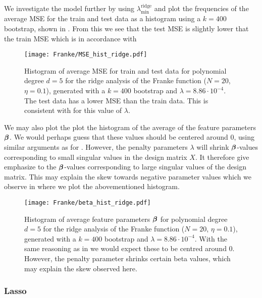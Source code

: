         We investigate the model further by using $\lambda^\mathrm{ridge}_\mathrm{min}$ and plot the frequencies of the average MSE for the train and test data as a histogram using a $k=400$ bootstrap, shown in . From this we see that the test MSE is slightly lower that the train MSE which is in accordance with 

        \begin{figure}
            \texttt{[image: Franke/MSE\_hist\_ridge.pdf]}
            \caption{Histogram of average MSE for train and test data for polynomial degree $d=5$ for the ridge analysis of the Franke function ($N=20$, $\eta=0.1$), generated with a $k=400$ bootstrap and $\lambda=8.86\cdot 10^{-4}$. The test data has a lower MSE than the train data. This is consistent with  for this value of $\lambda$.}
            \label{fig:mse_hist_ridge}
        \end{figure}

        We may also plot the plot the histogram of the average of the feature parameters $\boldsymbol{\beta}$. We would perhaps guess that these values should be centered around 0, using similar arguments as for . However, the penalty parameters $\lambda$ will shrink $\boldsymbol{\beta}$-values corresponding to small singular values in the design matrix $X$. It therefore give emphasize to the $\boldsymbol{\beta}$-values corresponding to large singular values of the design matrix. This may explain the skew towards negative parameter values which we observe in  where we plot the abovementioned histogram. 
        \begin{figure}
            \texttt{[image: Franke/beta\_hist\_ridge.pdf]}
            \caption{Histogram of average feature parameters $\boldsymbol{\beta}$ for polynomial degree $d=5$ for the ridge analysis of the Franke function ($N=20$, $\eta=0.1$), generated with a $k=400$ bootstrap and $\lambda=8.86\cdot 10^{-4}$. With the same reasoning as in  we would expect these to be centred around 0. However, the penalty parameter shrinks certain beta values, which may explain the skew observed here.}
            \label{fig:beta_hist_ridge}
        \end{figure}










        \subsubsection{Lasso}\label{sec:lassoanalysis}

